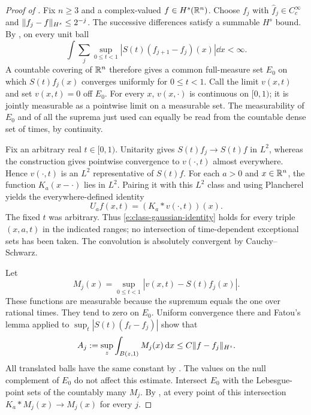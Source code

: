\begin{proof}[Proof of ]
Fix $n\ge3$ and a complex-valued $f\in H^s(\mathbb R^n)$.
Choose $f_j$ with $\widehat f_j\in C_c^\infty$ and
$\lVert f_j-f\rVert_{H^s}\le2^{-j}$.  The successive differences satisfy a
summable $H^s$ bound.  By , on every unit ball
\[
 \int\sum_j\sup_{0\le t<1}|S(t)(f_{j+1}-f_j)(x)|\dd x<\infty.
\]
A countable covering of $\mathbb R^n$ therefore gives a common full-measure
set $E_0$ on which $S(t)f_j(x)$ converges uniformly for $0\le t<1$.
Call the limit $v(x,t)$ and set $v(x,t)=0$ off $E_0$.  For every $x$,
$v(x,\cdot)$ is continuous on $[0,1)$; it is jointly measurable as a
pointwise limit on a measurable set.  The measurability of $E_0$ and of
all the suprema just used can equally be read from the countable dense
set of times, by continuity.

Fix an arbitrary real $t\in[0,1)$.  Unitarity gives
$S(t)f_j\to S(t)f$ in $L^2$, whereas the construction gives pointwise
convergence to $v(\cdot,t)$ almost everywhere.  Hence $v(\cdot,t)$ is
an $L^2$ representative of $S(t)f$.  For each $a>0$ and $x\in\mathbb R^n$,
the function $K_a(x-\cdot)$ lies in $L^2$.  Pairing it with this
$L^2$ class and using Plancherel yields the everywhere-defined identity
\begin{equation}
 U_a f(x,t)=(K_a*v(\cdot,t))(x).
 \label{e:class-gaussian-identity}
\end{equation}
The fixed $t$ was arbitrary.  Thus \eqref{e:class-gaussian-identity}
holds for every triple $(x,a,t)$ in the indicated ranges; no
intersection of time-dependent exceptional sets has been taken.
The convolution is absolutely convergent by Cauchy--Schwarz.

Let
\[
 M_j(x)=\sup_{0\le t<1}|v(x,t)-S(t)f_j(x)|.
\]
These functions are measurable because the supremum equals the one
over rational times.  They tend to zero on $E_0$.  Uniform convergence
there and Fatou's lemma applied to
$\sup_t|S(t)(f_\ell-f_j)|$ show that
\begin{equation}
 A_j:=\sup_z\int_{B(z,1)}M_j(x)\,\mathrm d x
       \le C\lVert f-f_j\rVert_{H^s}.
 \label{e:envelope-local-integrals}
\end{equation}
All translated balls have the same constant by .
The values on the null complement of $E_0$ do not affect this estimate.
Intersect $E_0$ with the Lebesgue-point sets of the countably many
$M_j$.  By , at every point of this intersection
$K_a*M_j(x)\to M_j(x)$ for every $j$.


\end{proof}

